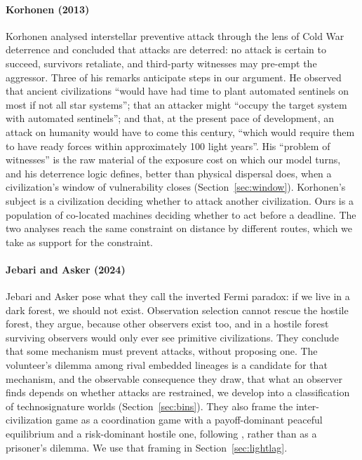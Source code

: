 \documentclass[preprint,12pt]{elsarticle}
\theoremstyle{definition}
\begin{document}
\paragraph{Korhonen (2013)}
Korhonen \citep{Korhonen2013} analysed interstellar preventive attack through the lens of Cold War deterrence and concluded that attacks are deterred: no attack is certain to succeed, survivors retaliate, and third-party witnesses may pre-empt the aggressor. Three of his remarks anticipate steps in our argument. He observed that ancient civilizations ``would have had time to plant automated sentinels on most if not all star systems''; that an attacker might ``occupy the target system with automated sentinels''; and that, at the present pace of development, an attack on humanity would have to come this century, ``which would require them to have ready forces within approximately 100 light years''. His ``problem of witnesses'' is the raw material of the exposure cost on which our model turns, and his deterrence logic defines, better than physical dispersal does, when a civilization's window of vulnerability closes (Section~\ref{sec:window}). Korhonen's subject is a civilization deciding whether to attack another civilization. Ours is a population of co-located machines deciding whether to act before a deadline. The two analyses reach the same constraint on distance by different routes, which we take as support for the constraint.

\paragraph{Jebari and Asker (2024)}
Jebari and Asker \citep{JebariAsker2024} pose what they call the inverted Fermi paradox: if we live in a dark forest, we should not exist. Observation selection cannot rescue the hostile forest, they argue, because other observers exist too, and in a hostile forest surviving observers would only ever see primitive civilizations. They conclude that some mechanism must prevent attacks, without proposing one. The volunteer's dilemma among rival embedded lineages is a candidate for that mechanism, and the observable consequence they draw, that what an observer finds depends on whether attacks are restrained, we develop into a classification of technosignature worlds (Section~\ref{sec:bins}). They also frame the inter-civilization game as a coordination game with a payoff-dominant peaceful equilibrium and a risk-dominant hostile one, following \citep{JebariOlsson2018}, rather than as a prisoner's dilemma. We use that framing in Section~\ref{sec:lightlag}.
\end{document}
